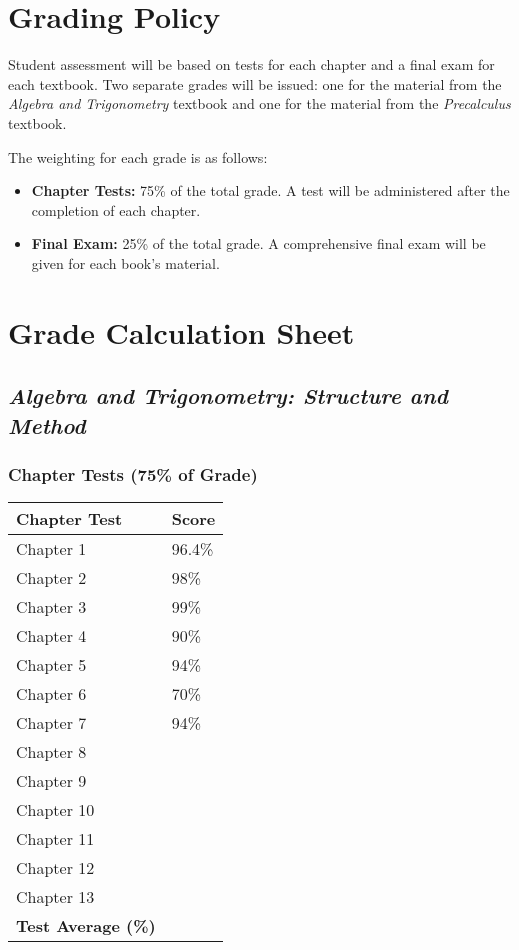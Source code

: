 \documentclass[11pt, letterpaper]{article}
\begin{document}
\section*{Grading Policy}
Student assessment will be based on tests for each chapter and a final exam for each textbook. Two separate grades will be issued: one for the material from the \textit{Algebra and Trigonometry} textbook and one for the material from the \textit{Precalculus} textbook.

The weighting for each grade is as follows:
\begin{itemize}
    \item \textbf{Chapter Tests:} 75\% of the total grade. A test will be administered after the completion of each chapter.
    \item \textbf{Final Exam:} 25\% of the total grade. A comprehensive final exam will be given for each book's material.
\end{itemize}

\newpage
\section*{Grade Calculation Sheet}

\subsection*{\textit{Algebra and Trigonometry: Structure and Method}}
\subsubsection*{Chapter Tests (75\% of Grade)}
\begin{tabular}{|p{6cm}|p{3cm}|}
\hline
\textbf{Chapter Test} & \textbf{Score} \\
\hline
Chapter 1 & 96.4\% \\ \hline
Chapter 2 & 98\% \\ \hline
Chapter 3 & 99\% \\ \hline
Chapter 4 & 90\% \\ \hline
Chapter 5 & 94\% \\ \hline
Chapter 6 & 70\% \\ \hline
Chapter 7 & 94\% \\ \hline
Chapter 8 & \\ \hline
Chapter 9 & \\ \hline
Chapter 10 & \\ \hline
Chapter 11 & \\ \hline
Chapter 12 & \\ \hline
Chapter 13 & \\ \hline
\textbf{Test Average (\%)} & \\
\hline
\end{tabular}
\end{document}

